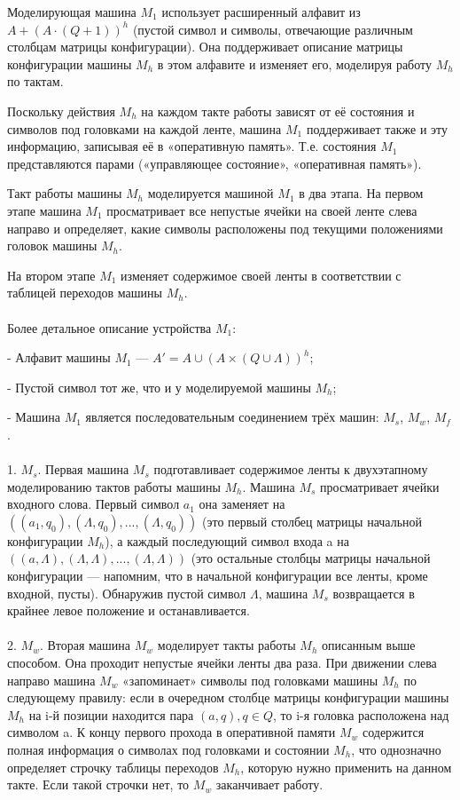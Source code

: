 Моделирующая машина $M_1$ использует расширенный алфавит из $A + (A \cdot (Q + 1))^h$
(пустой символ и символы, отвечающие различным столбцам матрицы конфигурации). Она поддерживает описание матрицы конфигурации машины $M_h$ в этом алфавите и изменяет его, моделируя
работу $M_h$ по тактам.

Поскольку действия $M_h$ на каждом такте работы зависят от её состояния и символов под
головками на каждой ленте, машина $M_1$ поддерживает также и эту информацию, записывая
её в «оперативную память». Т.е. состояния $M_1$ представляются парами («управляющее состояние», «оперативная память»).

Такт работы машины $M_h$ моделируется машиной $M_1$ в два этапа. На первом этапе машина $M_1$ просматривает все непустые ячейки на своей ленте слева направо и определяет, какие символы расположены под текущими положениями головок машины $M_h$.

На втором этапе $M_1$ изменяет содержимое своей ленты в соответствии с таблицей переходов
машины $M_h$. \\
\\

Более детальное описание устройства $M_1$: 

- Алфавит машины $M_1$ — $A' = A \cup (A \times (Q \cup \Lambda))^h$;

- Пустой символ тот же, что и у моделируемой машины $M_h$;

- Машина $M_1$ является последовательным соединением трёх машин: $M_s$, $M_w$, $M_f$.
\\
\\
1. $M_s$. Первая машина $M_s$ подготавливает содержимое ленты к двухэтапному моделированию тактов работы машины $M_h$. Машина $M_s$ просматривает ячейки входного слова. Первый символ $a_1$
она заменяет на$ ((a_1, q_0),(\Lambda, q_0), . . . ,(\Lambda, q_0))$ (это первый столбец матрицы начальной конфигурации $M_h$), а каждый последующий символ входа a на $((a,\Lambda),(\Lambda,\Lambda), . . . ,(\Lambda,\Lambda))$ (это остальные
столбцы матрицы начальной конфигурации — напомним, что в начальной конфигурации все
ленты, кроме входной, пусты). Обнаружив пустой символ $\Lambda$, машина $M_s$ возвращается в крайнее левое положение и останавливается.
\\
\\
2. $M_w$. Вторая машина $M_w$ моделирует такты работы $M_h$ описанным выше способом. Она проходит непустые ячейки ленты два раза. При движении слева направо машина $M_w$ «запоминает»
символы под головками машины $M_h$ по следующему правилу: если в очередном столбце матрицы конфигурации машины $M_h$ на i-й позиции находится пара $(a, q), q \in Q$, то i-я головка
расположена над символом a. К концу первого прохода в оперативной памяти $M_w$ содержится полная информация о символах под головками и состоянии $M_h$, что однозначно определяет строчку таблицы переходов $M_h$, которую нужно применить на данном такте. Если такой строчки нет, то $M_w$ заканчивает работу.

